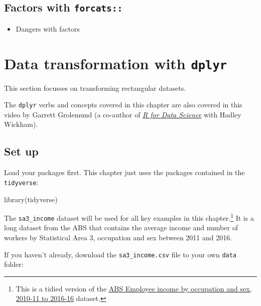 \documentclass[
]{book}
\newenvironment{Shaded}{\begin{snugshade}}{\end{snugshade}}
\newcommand{\FunctionTok}[1]{\textcolor[rgb]{0.00,0.00,0.00}{#1}}
\newcommand{\NormalTok}[1]{#1}
\providecommand{\tightlist}{%
  \setlength{\itemsep}{0pt}\setlength{\parskip}{0pt}}
\begin{document}
\hypertarget{factors-with-forcats}{%
\section{\texorpdfstring{Factors with \texttt{forcats::}}{Factors with forcats::}}\label{factors-with-forcats}}

\begin{itemize}
\tightlist
\item
  Dangers with factors
\end{itemize}

\hypertarget{data-transformation-with-dplyr}{%
\chapter{\texorpdfstring{Data transformation with \texttt{dplyr}}{Data transformation with dplyr}}\label{data-transformation-with-dplyr}}

This section focusses on transforming rectangular datasets.

The \texttt{dplyr} verbs and concepts covered in this chapter are also covered in this video by Garrett Grolemund (a co-author of \emph{\href{https://r4ds.had.co.nz/}{R for Data Science}} with Hadley Wickham).

\hypertarget{set-up}{%
\section{Set up}\label{set-up}}

Load your packages first. This chapter just uses the packages contained in the \texttt{tidyverse}:

\begin{Shaded}
\begin{Highlighting}[]
\FunctionTok{library}\NormalTok{(tidyverse)}
\end{Highlighting}
\end{Shaded}

The \texttt{sa3\_income} dataset will be used for all key examples in this chapter.\footnote{This is a tidied version of the \href{https://www.abs.gov.au/AUSSTATS/abs@.nsf/DetailsPage/6524.0.55.0022011-2016?OpenDocument}{ABS Employee income by occupation and sex, 2010-11 to 2016-16} dataset.} It is a long dataset from the ABS that contains the average income and number of workers by Statistical Area 3, occupation and sex between 2011 and 2016.

If you haven't already, download the \texttt{sa3\_income.csv} file to your own \texttt{data} folder:
\end{document}
